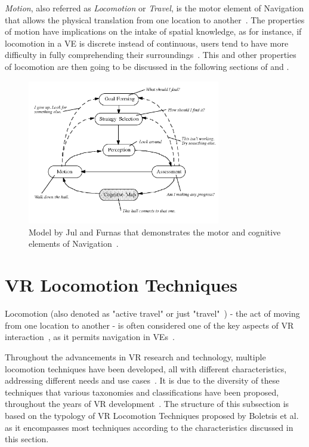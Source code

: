 \textit{Motion}, also referred as \textit{Locomotion} or \textit{Travel}, is the motor element of Navigation that allows the physical translation 
from one location to another~\cite{Santos2009}. The properties of motion have implications on the intake of spatial knowledge, as for instance, 
if locomotion in a \gls{VE} is discrete instead of continuous, users tend to have more difficulty in fully comprehending their 
surroundings~\cite{Langbehn2018}. This 
and other properties of locomotion are then going to be discussed in the following sections of  and 
.

\begin{figure}[t]
   \centering
   \includegraphics[width=0.75\textwidth]{NOVAthesisFiles/Images/papers/nav-model.png}
   \caption[Navigation Model by Jul and Furnas]{Model by Jul and Furnas that demonstrates the motor and cognitive elements of Navigation~\cite{Eastgate2014}.}
   \label{fig:nav-model}
\end{figure}

\section{VR Locomotion Techniques}
\label{sec:vr-locomotion-techniques}

Locomotion (also denoted as "active travel" or just "travel"~\cite{Langbehn2018}) - 
the act of moving from one location to another - is often considered one of the key aspects of \gls{VR} interaction~\cite{8255772}, 
as it permits navigation in \glspl{VE}~\cite{Boletsis2019}.

Throughout the advancements in \gls{VR} research and technology, multiple locomotion techniques have been developed, 
all with different characteristics, addressing different needs and use cases~\cite{Boletsis2022}. 
It is due to the diversity of these techniques that various taxonomies and classifications have been proposed,
throughout the years of \gls{VR} development~\cite{Boletsis2022}. 
The structure of this subsection is based on the typology of \gls{VR} Locomotion Techniques proposed by Boletsis et al.~\cite{Boletsis2022} 
as it encompasses most techniques according to the characteristics discussed in this section.

